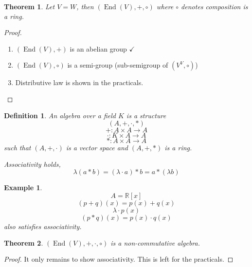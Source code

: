 \documentclass[a4paper,landscape,twocolumn]{article}
\newtheorem{theorem}{Theorem}
\newtheorem{defi}{Definition}
\newtheorem{ex}{Example}
\DeclareMathOperator\End{End} %
\begin{document}
\begin{theorem}
  \label{satz-5-8}
  Let $V = W$, then $(\End(V), +, \circ)$ where $\circ$ denotes composition is a ring.
\end{theorem}
\begin{proof}
  \begin{enumerate}
    \item $(\End(V), +)$ is an abelian group $\checkmark$
    \item $(\End(V), \circ)$ is a semi-group (sub-semigroup of $(V^V, \circ)$)
    \item Distributive law is shown in the practicals.
  \end{enumerate}
\end{proof}

\begin{defi}
  An \emph{algebra} over a field $K$ is a structure
  \[ (A, +, \cdot, *) \]
  \[ +: A \times A \rightarrow A \]
  \[ \cdot: K \times A \rightarrow A \]
  \[ *: A \times A \rightarrow A \]
  such that $(A, +, \cdot)$ is a vector space and $(A, +, *)$ is a ring.

  Associativity holds,
  \[ \lambda (a * b) = (\lambda \cdot a) * b = a * (\lambda b) \]
\end{defi}

\begin{ex}
  \[ A = \mathbb R[x] \]
  \[ (p + q)(x) = p(x) + q(x) \]
  \[ \lambda \cdot p(x) \]
  \[ (p * q)(x) = p(x) \cdot q(x) \]
  also satisfies associativity.
\end{ex}

\begin{theorem}
  \label{satz-5-10}
  $(\End(V), +, \cdot, \circ)$ is a non-commutative algebra.
\end{theorem}
\begin{proof}
  It only remains to show associativity.
  This is left for the practicals.
\end{proof}
\end{document}

